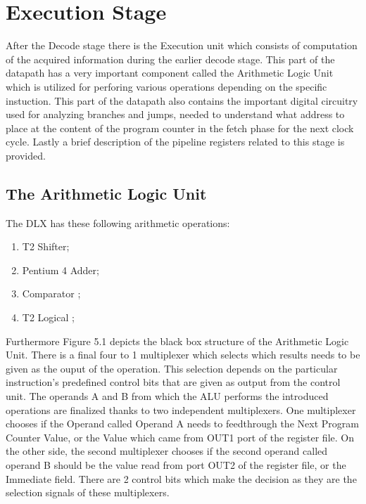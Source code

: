 \chapter{Execution Stage}
\label{ExecutionUnit}

After the Decode stage there is the Execution unit which consists of  computation of the acquired information during the earlier decode stage.
This part of the datapath has a very important component called the Arithmetic Logic Unit which is utilized for perforing various operations depending on the specific instuction.
This part of the datapath also contains the important digital circuitry used for analyzing branches and jumps, needed to understand what address to place 
at the content of the program counter in the fetch phase for the next clock cycle. Lastly a brief description of the pipeline registers related to this stage is provided.

\section{ The Arithmetic Logic Unit }
The DLX has these following arithmetic operations:
\begin{enumerate}
    \item T2 Shifter;
    \item Pentium 4 Adder;
    \item Comparator ;
    \item T2 Logical ;
    \end{enumerate}

Furthermore Figure 5.1 depicts the black box structure of the Arithmetic Logic Unit. There is a final four to 1 multiplexer which selects which results
needs to be given as the ouput of the operation. This selection depends on the particular instruction's predefined control bits that are given as output from the
control unit. The operands A and B from which the ALU performs the introduced operations are finalized thanks to two independent multiplexers. One multiplexer
chooses if the Operand called Operand A needs to feedthrough the Next Program Counter Value, or the Value which came from OUT1 port of the register file. On the other side,
the second multiplexer chooses if the second operand called operand B should be the value read from port OUT2 of the register file, or the Immediate field. There are 2 control
bits which make the decision as they are the selection signals of these multiplexers.

